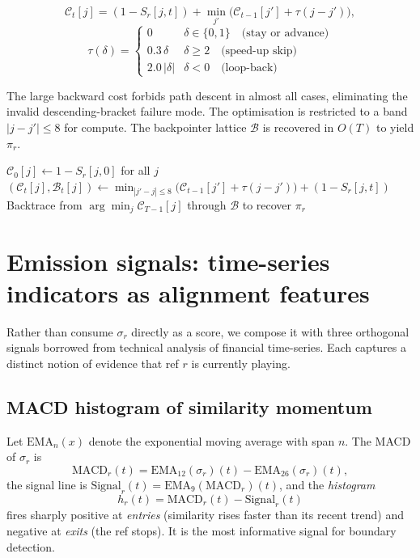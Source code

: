 \documentclass[11pt,a4paper]{article}
\begin{document}
\begin{equation}
\mathcal{C}_t[j] = (1 - S_r[j, t]) + \min_{j'} \Big( \mathcal{C}_{t-1}[j'] + \tau(j - j') \Big),
\end{equation}
\begin{equation}
\tau(\delta) = \begin{cases}
0 & \delta \in \{0, 1\} \quad \text{(stay or advance)} \\
0.3\,\delta & \delta \geq 2 \quad \text{(speed-up skip)} \\
2.0\,|\delta| & \delta < 0 \quad \text{(loop-back)}
\end{cases}
\end{equation}

The large backward cost forbids path descent in almost all cases, eliminating the invalid descending-bracket failure mode. The optimisation is restricted to a band $|j - j'| \le 8$ for compute. The backpointer lattice $\mathcal{B}$ is recovered in $O(T)$ to yield $\pi_r$.

\begin{algorithm}[h]
\caption{\textsc{RefPositionViterbi}$(S_r)$}
\begin{algorithmic}[1]
\State $\mathcal{C}_0[j] \leftarrow 1 - S_r[j, 0]$ for all $j$
        \State $(\mathcal{C}_t[j], \mathcal{B}_t[j]) \leftarrow \min_{|j' - j| \le 8} \big(\mathcal{C}_{t-1}[j'] + \tau(j - j')\big) + (1 - S_r[j,t])$
    \EndFor
\EndFor
\State Backtrace from $\arg\min_j \mathcal{C}_{T-1}[j]$ through $\mathcal{B}$ to recover $\pi_r$
\end{algorithmic}
\end{algorithm}

\section{Emission signals: time-series indicators as alignment features}

Rather than consume $\sigma_r$ directly as a score, we compose it with three orthogonal signals borrowed from technical analysis of financial time-series. Each captures a distinct notion of evidence that ref $r$ is currently playing.

\subsection{MACD histogram of similarity momentum}

Let $\text{EMA}_n(x)$ denote the exponential moving average with span $n$. The MACD of $\sigma_r$ is
\[
\text{MACD}_r(t) = \text{EMA}_{12}(\sigma_r)(t) - \text{EMA}_{26}(\sigma_r)(t),
\]
the signal line is $\text{Signal}_r(t) = \text{EMA}_9(\text{MACD}_r)(t)$, and the \emph{histogram}
\[
h_r(t) = \text{MACD}_r(t) - \text{Signal}_r(t)
\]
fires sharply positive at \emph{entries} (similarity rises faster than its recent trend) and negative at \emph{exits} (the ref stops). It is the most informative signal for boundary detection.
\end{document}
